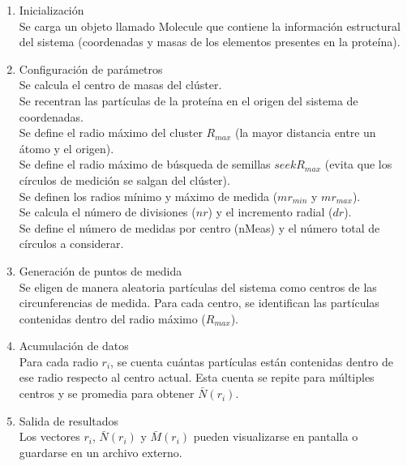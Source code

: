 \begin{enumerate}
	\item Inicializaci\'{o}n\\
	 Se carga un objeto llamado Molecule que contiene la informaci\'{o}n estructural del sistema (coordenadas y masas de los elementos presentes en la prote\'{i}na).
	
	\item Configuraci\'{o}n de par\'{a}metros\\
	Se calcula el centro de masas del cl\'{u}ster.\\
	Se recentran las part\'{i}culas de la prote\'{i}na en el origen del sistema de coordenadas.\\
	Se define el radio m\'{a}ximo del cluster \(R_{max}\) (la mayor distancia entre un \'{a}tomo y el origen).\\
	Se define el radio m\'{a}ximo de b\'{u}squeda de semillas \(seekR_{max}\) (evita que los c\'{i}rculos de medici\'{o}n se salgan del cl\'{u}ster).\\
	Se definen los radios m\'{i}nimo y m\'{a}ximo de medida (\(mr_{min}\) y \(mr_{max}\)).\\
	Se calcula el n\'{u}mero de divisiones (\(nr\)) y el incremento radial (\(dr\)).\\
	Se define el n\'{u}mero de medidas por centro (nMeas) y el n\'{u}mero total de c\'{i}rculos a considerar.
	
	\item Generaci\'{o}n de puntos de medida\\
	Se eligen de manera aleatoria part\'{i}culas del sistema como centros de las circunferencias de medida. Para cada centro, se identifican las part\'{i}culas contenidas dentro del radio m\'{a}ximo (\(R_{max}\)).
	
	\item Acumulaci\'{o}n de datos\\
	Para cada radio \( r_i \), se cuenta cu\'{a}ntas part\'{i}culas est\'{a}n contenidas dentro de ese radio respecto al centro actual. Esta cuenta se repite para m\'{u}ltiples centros y se promedia para obtener \( \bar{N}(r_i) \).
	
	
	\item Salida de resultados\\
	Los vectores \(r_{i}\), \( \bar{N}(r_i) \) y \( \bar{M}(r_i)\) pueden visualizarse en pantalla o guardarse en un archivo externo.
\end{enumerate}




